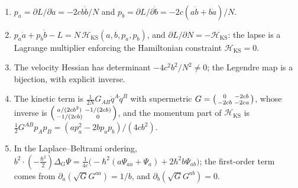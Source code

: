 \begin{theorem}\label{thm:kslegendre}\ver\
\begin{enumerate}[label=(\roman*)]
\item $p_a=\partial L/\partial\dot a=-2cb\dot b/N$ and $p_b=\partial L/\partial\dot b=-2c(a\dot b+b\dot a)/N$.
\item $p_a\dot a+p_b\dot b-L=N\,\mathcal H_{\mathrm{KS}}(a,b,p_a,p_b)$, and $\partial L/\partial N=-\mathcal H_{\mathrm{KS}}$: the lapse is a Lagrange multiplier enforcing the Hamiltonian constraint $\mathcal H_{\mathrm{KS}}=0$.
\item The velocity Hessian has determinant $-4c^2b^2/N^2\ne0$; the Legendre map is a bijection, with explicit inverse.
\item The kinetic term is $\frac1{2N}G_{AB}\dot q^A\dot q^B$ with supermetric $G=\begin{psmallmatrix}0&-2cb\\-2cb&-2ca\end{psmallmatrix}$, whose inverse is $\begin{psmallmatrix}a/(2cb^2)&-1/(2cb)\\-1/(2cb)&0\end{psmallmatrix}$, and the momentum part of $\mathcal H_{\mathrm{KS}}$ is $\frac12G^{AB}p_Ap_B=(ap_a^2-2bp_ap_b)/(4cb^2)$.
\item In the Laplace--Beltrami ordering, $b^2\cdot(-\frac{\hbar^2}2)\Delta_G\Psi=\frac1{4c}\bigl(-\hbar^2(a\Psi_{aa}+\Psi_a)+2\hbar^2b\Psi_{ab}\bigr)$; the first-order term comes from $\partial_a(\sqrt{G}G^{aa})=1/b$, and $\partial_b(\sqrt GG^{ab})=0$.
\end{enumerate}
\end{theorem}
